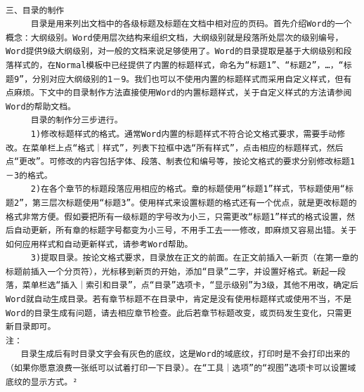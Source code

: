 \begin{verbatim}
 
三、目录的制作 
     目录是用来列出文档中的各级标题及标题在文档中相对应的页码。首先介绍Word的一个概念：大纲级别。Word使用层次结构来组织文档，大纲级别就是段落所处层次的级别编号，Word提供9级大纲级别，对一般的文档来说足够使用了。Word的目录提取是基于大纲级别和段落样式的，在Normal模板中已经提供了内置的标题样式，命名为“标题1”、“标题2”，…，“标题9”，分别对应大纲级别的1－9。我们也可以不使用内置的标题样式而采用自定义样式，但有点麻烦。下文中的目录制作方法直接使用Word的内置标题样式，关于自定义样式的方法请参阅Word的帮助文档。 
     目录的制作分三步进行。 
     1)修改标题样式的格式。通常Word内置的标题样式不符合论文格式要求，需要手动修改。在菜单栏上点“格式｜样式”，列表下拉框中选“所有样式”，点击相应的标题样式，然后点“更改”。可修改的内容包括字体、段落、制表位和编号等，按论文格式的要求分别修改标题1－3的格式。 
     2)在各个章节的标题段落应用相应的格式。章的标题使用“标题1”样式，节标题使用“标题2”，第三层次标题使用“标题3”。使用样式来设置标题的格式还有一个优点，就是更改标题的格式非常方便。假如要把所有一级标题的字号改为小三，只需更改“标题1”样式的格式设置，然后自动更新，所有章的标题字号都变为小三号，不用手工去一一修改，即麻烦又容易出错。关于如何应用样式和自动更新样式，请参考Word帮助。 
     3)提取目录。按论文格式要求，目录放在正文的前面。在正文前插入一新页（在第一章的标题前插入一个分页符），光标移到新页的开始，添加“目录”二字，并设置好格式。新起一段落，菜单栏选“插入｜索引和目录”，点“目录”选项卡，“显示级别”为3级，其他不用改，确定后Word就自动生成目录。若有章节标题不在目录中，肯定是没有使用标题样式或使用不当，不是Word的目录生成有问题，请去相应章节检查。此后若章节标题改变，或页码发生变化，只需更新目录即可。 
注： 
   目录生成后有时目录文字会有灰色的底纹，这是Word的域底纹，打印时是不会打印出来的（如果你愿意浪费一张纸可以试着打印一下目录）。在“工具｜选项”的“视图”选项卡可以设置域底纹的显示方式。²
 

\end{verbatim}
